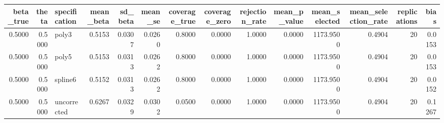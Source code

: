 \begin{tabular}{rrlrrrrrrrrrrr}
\toprule
beta_true & theta & specification & mean_beta & sd_beta & mean_se & coverage_true & coverage_zero & rejection_rate & mean_p_value & mean_selected & mean_selection_rate & replications & bias \\
\midrule
0.5000 & 0.5000 & poly3 & 0.5153 & 0.0307 & 0.0260 & 0.8000 & 0.0000 & 1.0000 & 0.0000 & 1173.9500 & 0.4904 & 20 & 0.0153 \\
0.5000 & 0.5000 & poly5 & 0.5153 & 0.0313 & 0.0262 & 0.8000 & 0.0000 & 1.0000 & 0.0000 & 1173.9500 & 0.4904 & 20 & 0.0153 \\
0.5000 & 0.5000 & spline6 & 0.5152 & 0.0313 & 0.0262 & 0.8000 & 0.0000 & 1.0000 & 0.0000 & 1173.9500 & 0.4904 & 20 & 0.0152 \\
0.5000 & 0.5000 & uncorrected & 0.6267 & 0.0329 & 0.0302 & 0.0500 & 0.0000 & 1.0000 & 0.0000 & 1173.9500 & 0.4904 & 20 & 0.1267 \\
\bottomrule
\end{tabular}
